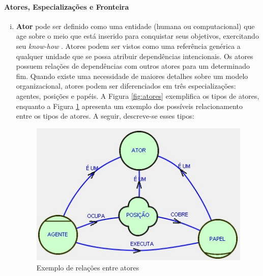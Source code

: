             \paragraph{Atores, Especializações e Fronteira}
                \begin{enumerate}[i.] %
                    \item \textbf{Ator} pode ser definido como uma entidade (humana ou computacional) que age sobre o meio que está inserido para conquistar seus objetivos, exercitando seu \emph{know-how} \cite{yu1995modelling}. Atores podem ser vistos como uma referência genérica a qualquer unidade que se possa atribuir dependências intencionais. Os atores possuem relações de dependências com outros atores para um determinado fim. Quando existe uma necessidade de maiores detalhes sobre um modelo organizacional, atores podem ser diferenciados em três especializações: agentes, posições e papéis. A Figura \ref{fig:atores} exemplifica os tipos de atores, enquanto a Figura \ref{fig:atores-exemplo} apresenta um exemplo dos possíveis relacionamento entre os tipos de atores. A seguir, descreve-se esses tipos:
                    
                    \begin{figure}[h!]
                        \centering
                            \includegraphics[scale=0.8]{Figuras/istar/atores.jpg}
                            \caption{Exemplo de relações entre atores \cite{santos2008istar}}
                            \label{fig:atores-exemplo}
                    \end{figure}


\end{enumerate}
